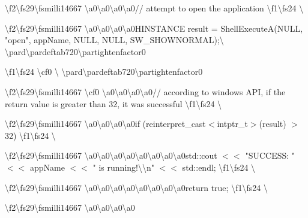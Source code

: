 \textbackslash{}f2\textbackslash{}fs29\textbackslash{}fsmilli14667 \textbackslash{}\textquotesingle{}a0\textbackslash{}\textquotesingle{}a0\textbackslash{}\textquotesingle{}a0\textbackslash{}\textquotesingle{}a0/\+/\+ attempt to open the application \textbackslash{}f1\textbackslash{}fs24 \textbackslash{}

\textbackslash{}f2\textbackslash{}fs29\textbackslash{}fsmilli14667 \textbackslash{}\textquotesingle{}a0\textbackslash{}\textquotesingle{}a0\textbackslash{}\textquotesingle{}a0\textbackslash{}\textquotesingle{}a0\+HINSTANCE result = Shell\+ExecuteA(NULL, "{}open"{}, app\+Name, NULL, NULL, SW\+\_\+\+SHOWNORMAL);\textbackslash{} \textbackslash{}pard\textbackslash{}pardeftab720\textbackslash{}partightenfactor0

\textbackslash{}f1\textbackslash{}fs24 \textbackslash{}cf0 \textbackslash{} \textbackslash{}pard\textbackslash{}pardeftab720\textbackslash{}partightenfactor0

\textbackslash{}f2\textbackslash{}fs29\textbackslash{}fsmilli14667 \textbackslash{}cf0 \textbackslash{}\textquotesingle{}a0\textbackslash{}\textquotesingle{}a0\textbackslash{}\textquotesingle{}a0\textbackslash{}\textquotesingle{}a0/\+/\+ according to windows API, if the return value is greater than 32, it was successful \textbackslash{}f1\textbackslash{}fs24 \textbackslash{}

\textbackslash{}f2\textbackslash{}fs29\textbackslash{}fsmilli14667 \textbackslash{}\textquotesingle{}a0\textbackslash{}\textquotesingle{}a0\textbackslash{}\textquotesingle{}a0\textbackslash{}\textquotesingle{}a0if (reinterpret\+\_\+cast$<$intptr\+\_\+t$>$(result) \texorpdfstring{$>$}{>} 32) \textbackslash{}f1\textbackslash{}fs24 \textbackslash{}

\textbackslash{}f2\textbackslash{}fs29\textbackslash{}fsmilli14667 \textbackslash{}\textquotesingle{}a0\textbackslash{}\textquotesingle{}a0\textbackslash{}\textquotesingle{}a0\textbackslash{}\textquotesingle{}a0\textbackslash{}\textquotesingle{}a0\textbackslash{}\textquotesingle{}a0\textbackslash{}\textquotesingle{}a0\textbackslash{}\textquotesingle{}a0std::\+cout \texorpdfstring{$<$}{<}\texorpdfstring{$<$}{<} "{}\+SUCCESS:\+ "{} \texorpdfstring{$<$}{<}\texorpdfstring{$<$}{<} app\+Name \texorpdfstring{$<$}{<}\texorpdfstring{$<$}{<} "{} is running!\textbackslash{}\textbackslash{}n"{} \texorpdfstring{$<$}{<}\texorpdfstring{$<$}{<} std::\+endl; \textbackslash{}f1\textbackslash{}fs24 \textbackslash{}

\textbackslash{}f2\textbackslash{}fs29\textbackslash{}fsmilli14667 \textbackslash{}\textquotesingle{}a0\textbackslash{}\textquotesingle{}a0\textbackslash{}\textquotesingle{}a0\textbackslash{}\textquotesingle{}a0\textbackslash{}\textquotesingle{}a0\textbackslash{}\textquotesingle{}a0\textbackslash{}\textquotesingle{}a0\textbackslash{}\textquotesingle{}a0return true; \textbackslash{}f1\textbackslash{}fs24 \textbackslash{}

\textbackslash{}f2\textbackslash{}fs29\textbackslash{}fsmilli14667 \textbackslash{}\textquotesingle{}a0\textbackslash{}\textquotesingle{}a0\textbackslash{}\textquotesingle{}a0\textbackslash{}\textquotesingle{}a0 